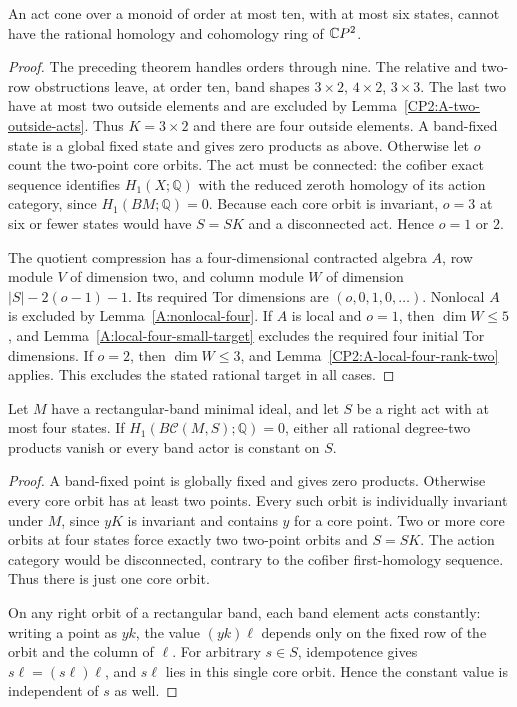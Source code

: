 \begin{proposition}
\label{CP2:A-ten-six-state-rational}
An act cone over a monoid of order at most ten, with
at most six states, cannot have the rational homology
and cohomology ring of $\mathbb{C}P^2$.
\end{proposition}
\begin{proof}
The preceding theorem handles orders through nine.
The relative and two-row obstructions leave, at order
ten, band shapes $3\times2$, $4\times2$, $3\times3$.
The last two have at most two outside elements and
are excluded by Lemma~\ref{CP2:A-two-outside-acts}.
Thus $K=3\times2$ and there are four outside elements.
A band-fixed state is a global fixed state and gives
zero products as above. Otherwise let $o$ count the
two-point core orbits. The act must be connected:
the cofiber exact sequence identifies $H_1(X;\mathbb Q)$
with the reduced zeroth homology of its action category,
since $H_1(BM;\mathbb Q)=0$. Because each core orbit
is invariant, $o=3$ at six or fewer states would have
$S=SK$ and a disconnected act. Hence $o=1$ or $2$.

The quotient compression has a four-dimensional
contracted algebra $A$, row module $V$ of dimension
two, and column module $W$ of dimension
$|S|-2(o-1)-1$. Its required Tor dimensions are
$(o,0,1,0,\ldots)$. Nonlocal $A$ is excluded by
Lemma~\ref{A:nonlocal-four}. If $A$ is local and
$o=1$, then $\dim W\leq5$, and
Lemma~\ref{A:local-four-small-target} excludes the
required four initial Tor dimensions. If $o=2$,
then $\dim W\leq3$, and
Lemma~\ref{CP2:A-local-four-rank-two} applies.
This excludes the stated rational target in all cases.
\end{proof}

\begin{lemma}
\label{CP2:A-four-state-band}
Let $M$ have a rectangular-band minimal ideal, and
let $S$ be a right act with at most four states.
If $H_1(B\mathcal C(M,S);\mathbb Q)=0$, either all
rational degree-two products vanish or every band
actor is constant on $S$.
\end{lemma}
\begin{proof}
A band-fixed point is globally fixed and gives zero
products. Otherwise every core orbit has at least
two points. Every such orbit is individually invariant
under $M$, since $yK$ is invariant and contains $y$
for a core point. Two or more core orbits at four
states force exactly two two-point orbits and $S=SK$.
The action category would be disconnected, contrary
to the cofiber first-homology sequence. Thus there
is just one core orbit.

On any right orbit of a rectangular band, each band
element acts constantly: writing a point as $yk$,
the value $(yk)\ell$ depends only on the fixed row
of the orbit and the column of $\ell$. For arbitrary
$s\in S$, idempotence gives $s\ell=(s\ell)\ell$,
and $s\ell$ lies in this single core orbit. Hence
the constant value is independent of $s$ as well.
\end{proof}

